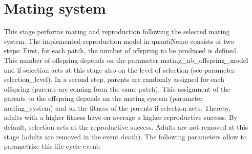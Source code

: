 \documentclass[letterpaper,12pt,oneside]{book}
\begin{document}
\section{Mating system}\label{sec:MatingSystem}
This stage performs mating and reproduction following the selected mating system. The implemented reproduction model in quantiNemo consists of two steps: First, for each patch, the number of offspring to be produced is defined. This number of offspring depends on the parameter \textsf{mating\_nb\_offspring\_model} and if selection acts at this stage also on the level of selection (see parameter \textsf{selection\_level}). In a second step, parents are randomly assigned for each offspring (parents are coming form the same patch). This assignment of the parents to the offspring depends on the mating system (parameter \textsf{mating\_system}) and on the fitness of the parents if selection acts. Thereby, adults with a higher fitness have on average a higher reproductive success. By default, selection acts at the reproductive success. Adults are not removed at this stage (adults are removed in the event \textsf{death}). The following parameters allow to parametrize this life cycle event:
 
\end{document}
